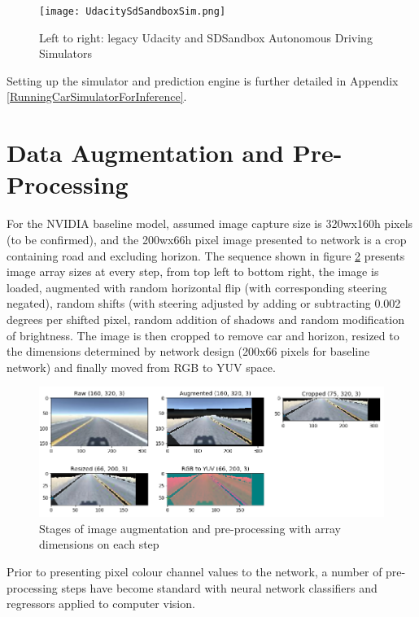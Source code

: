 \begin{figure}[h!]
\centering
\texttt{[image: UdacitySdSandboxSim.png]}
\caption{Left to right: legacy Udacity and SDSandbox Autonomous Driving Simulators}
\label{fig:UdacitySdSandboxAutonomous}
\end{figure}

Setting up the simulator and prediction engine is further detailed in Appendix
\ref{RunningCarSimulatorForInference}.

\section{Data Augmentation and Pre-Processing}


For the NVIDIA baseline model, assumed image capture size is 320wx160h pixels (to be confirmed), and the 200wx66h pixel image presented to network is a crop containing road and excluding horizon. The sequence shown in figure \ref{fig:augpreproc} presents image array sizes at every step, from top left to bottom right, the image is loaded, augmented with random horizontal flip (with corresponding steering negated), random shifts (with steering adjusted by adding or subtracting 0.002 degrees per shifted pixel, random addition of shadows and random modification of brightness. The image is then cropped to remove car and horizon, resized to the dimensions determined by network design (200x66 pixels for baseline network) and finally moved from RGB to YUV space.

\begin{figure}[ht]
 \centering 
 \includegraphics[width=\textwidth]{Figures/AugmentationPreProcessing.png}
 \caption{Stages of image augmentation and pre-processing with array dimensions on each step}
 \label{fig:augpreproc}
\end{figure}

Prior to presenting pixel colour channel values to the network, a number of pre-processing steps have become standard with neural network classifiers and regressors applied to computer vision.

